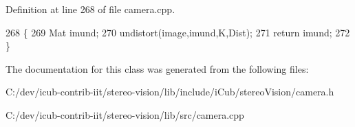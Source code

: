 Definition at line 268 of file camera.\+cpp.


\begin{DoxyCode}
268                                     \{
269     Mat imund;
270     undistort(image,imund,K,Dist);
271     \textcolor{keywordflow}{return} imund;
272 \}
\end{DoxyCode}


The documentation for this class was generated from the following files\+:\begin{DoxyCompactItemize}
\item 
C\+:/dev/icub-\/contrib-\/iit/stereo-\/vision/lib/include/i\+Cub/stereo\+Vision/camera.\+h\item 
C\+:/dev/icub-\/contrib-\/iit/stereo-\/vision/lib/src/camera.\+cpp\end{DoxyCompactItemize}
